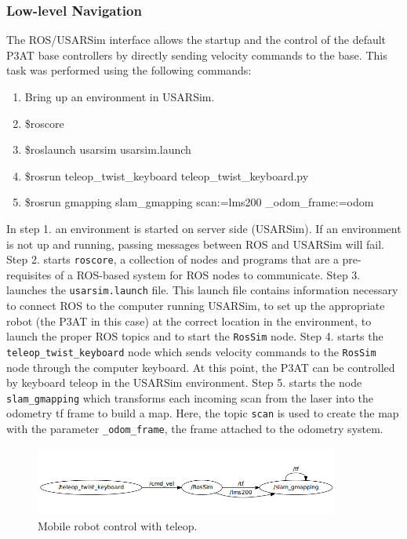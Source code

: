 \subsubsection*{Low-level Navigation}
The ROS/USARSim interface allows the startup and the control of the default P3AT base controllers by directly sending velocity commands to the base. This task was performed using the following commands:
\begin{enumerate}
\item\footnotesize{Bring up an environment in USARSim.        }
\item\footnotesize{\$roscore}
\item\footnotesize{\$roslaunch usarsim usarsim.launch}
\item\footnotesize{\$rosrun teleop\_twist\_keyboard teleop\_twist\_keyboard.py}
\item\footnotesize{\$rosrun gmapping slam\_gmapping scan:=lms200 \_odom\_frame:=odom}
\end{enumerate}

In step 1. an environment is started on server side (USARSim). If an environment is not up and running, passing messages between ROS and USARSim will fail. Step 2. starts \texttt{roscore}, a collection of nodes and programs that are a pre-requisites of a ROS-based system for ROS nodes to communicate. Step 3. launches the \texttt{usarsim.launch} file. This launch file contains information necessary to connect ROS to the computer running USARSim, to set up the appropriate robot (the P3AT in this case) at the correct location in the environment, to launch the proper ROS topics and to start the \texttt{RosSim} node. Step 4. starts the \texttt{teleop\_twist\_keyboard} node which sends velocity commands to the \texttt{RosSim} node through the computer keyboard. At this point, the P3AT can be controlled by keyboard teleop in the USARSim environment. Step 5. starts the node \texttt{slam\_gmapping} which transforms each incoming scan from the laser into the odometry tf frame to build a map. Here, the topic \texttt{scan} is used to create the map with the parameter \texttt{\_odom\_frame}, the frame attached to the odometry system.

\begin{figure}[t!]
\centering
\includegraphics[width=10cm]{Figures/Misc/low-level.jpg}
\caption{Mobile robot control with teleop.}\label{fig:teleop}
\end{figure}

